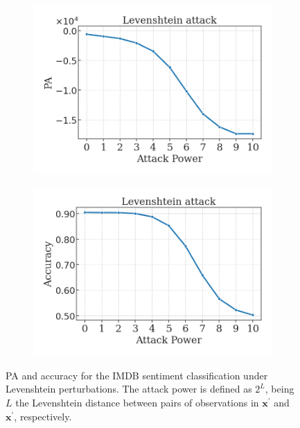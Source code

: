 \begin{figure}[H]
    \centering
    \begin{subfigure}[b]{0.45\textwidth}
        \centering
        \includegraphics[width=\textwidth]{img/results_discussion/empirical/levenshtein_logPA.png}
    \end{subfigure}
    \hfill
    \begin{subfigure}[b]{0.45\textwidth}
        \centering
        \includegraphics[width=\textwidth]{img/results_discussion/empirical/levenshtein_AFR_true.png}
    \end{subfigure}
    \caption{PA and accuracy for the IMDB sentiment classification under Levenshtein perturbations.
    The attack power is defined as $2^L$, being $L$ the Levenshtein distance between pairs of
    observations in $\bm{x}^\prime$ and $\bm{x}^{\prime}$, respectively.}
    \label{fig:imdb_levenshtein}
\end{figure}

